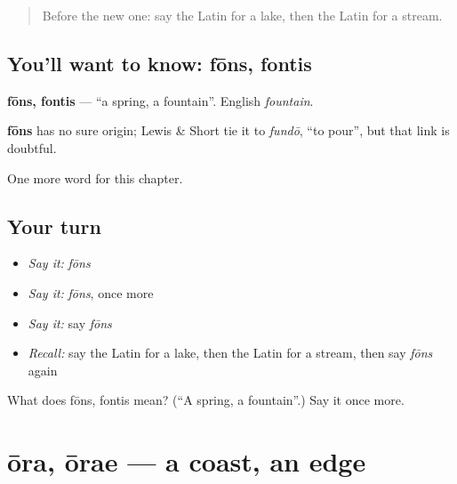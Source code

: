 \label{lesson:LA-C87-fons}



\begin{quote}
Before the new one: say the Latin for a lake, then the Latin for a stream.
\end{quote}

\subsection*{You'll want to know: fōns, fontis}
\textbf{fōns, fontis} — \textquotedblleft{}a spring, a fountain\textquotedblright{}. English \emph{fountain}.

\begin{cousinweb}
\textbf{fōns} has no sure origin; Lewis \& Short tie it to \emph{fundō}, \textquotedblleft{}to pour\textquotedblright{}, but that link is doubtful.
\end{cousinweb}

\begin{grammarlens}[title={What you've built}]
One more word for this chapter.
\end{grammarlens}

\subsection*{Your turn}
\begin{itemize}
\raggedright
  \item \emph{Say it:} \emph{fōns}
  \item \emph{Say it:} \emph{fōns}, once more
  \item \emph{Say it:} say \emph{fōns}
  \item \emph{Recall:} say the Latin for a lake, then the Latin for a stream, then say \emph{fōns} again
\end{itemize}

\begin{tcolorbox}[breakable,colback=teal!4,colframe=teal!35!black,title={Before you move on}]
What does fōns, fontis mean? (\textquotedblleft{}A spring, a fountain\textquotedblright{}.) Say it once more.
\end{tcolorbox}
\section[ōra, ōrae]{ōra, ōrae — a coast, an edge}

\label{lesson:LA-C87-ora}



